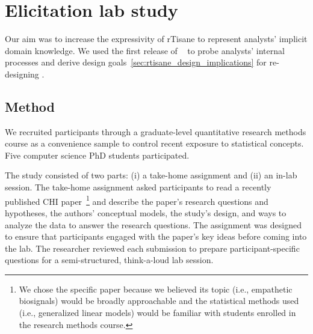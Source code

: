 \def\unit{\texttt{Unit}\xspace}
\def\measure{\texttt{Measure}\xspace}
\def\setup{\texttt{SetUp}\xspace}

\section{Elicitation lab study} \label{sec:exploratoryStudy}
Our aim was to increase the expressivity of rTisane to represent analysts'
implicit domain knowledge. We used the first release of
\tisane~\cite{jun2022tisane} to probe analysts' internal processes and derive
design goals~\autoref{sec:rtisane_design_implications} for re-designing \tisane.

\subsection{Method}
We recruited participants through a graduate-level quantitative research methods
course as a convenience sample to control recent exposure to
statistical concepts. Five computer science PhD students participated.

The study consisted of two parts: (i) a take-home assignment and (ii) an in-lab
session. The take-home assignment asked participants to read a recently
published CHI paper~\cite{winters2021heartbeat}\footnote{We chose the specific
paper because we believed its topic (i.e., empathetic biosignals) would be
broadly approachable and the statistical methods used (i.e., generalized linear
models) would be familiar with students enrolled in the research methods
course.} and describe the paper's research questions and hypotheses, the
authors' conceptual models, the study's design, and ways to analyze the data to
answer the research questions. The assignment was designed to ensure that
participants engaged with the paper's key ideas before coming into the lab. The
researcher reviewed each submission to prepare participant-specific questions
for a semi-structured, think-a-loud lab session. 

